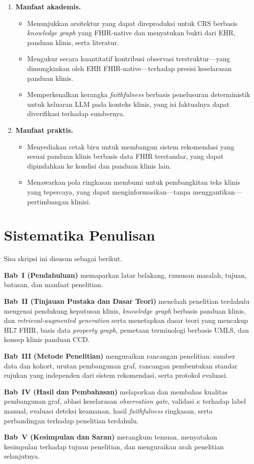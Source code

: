 \begin{enumerate}
    \item \textbf{Manfaat akademis.}
    \begin{itemize}
        \item Menunjukkan arsitektur yang dapat direproduksi untuk CRS berbasis
        \emph{knowledge graph} yang FHIR-native dan menyatukan bukti dari EHR, panduan klinis,
        serta literatur.
        \item Mengukur secara kuantitatif kontribusi observasi terstruktur---yang
        dimungkinkan oleh EHR FHIR-native---terhadap presisi keselarasan panduan klinis.
        \item Memperkenalkan kerangka \emph{faithfulness} berbasis penelusuran deterministik untuk
        keluaran LLM pada konteks klinis, yang isi faktualnya dapat diverifikasi terhadap
        sumbernya.
    \end{itemize}
    \item \textbf{Manfaat praktis.}
    \begin{itemize}
        \item Menyediakan cetak biru untuk membangun sistem rekomendasi yang sesuai panduan klinis
        berbasis data FHIR terstandar, yang dapat dipindahkan ke kondisi dan panduan klinis lain.
        \item Menawarkan pola ringkasan membumi untuk pembangkitan teks klinis yang
        tepercaya, yang dapat menginformasikan---tanpa menggantikan---pertimbangan klinisi.
    \end{itemize}
\end{enumerate}

\section{Sistematika Penulisan}

Sisa skripsi ini disusun sebagai berikut.

\noindent\textbf{Bab~I (Pendahuluan)} memaparkan latar belakang, rumusan masalah, tujuan,
batasan, dan manfaat penelitian.

\noindent\textbf{Bab~II (Tinjauan Pustaka dan Dasar Teori)} menelaah penelitian terdahulu
mengenai pendukung keputusan klinis, \emph{knowledge graph} berbasis panduan klinis, dan
\emph{retrieval-augmented generation} serta menetapkan dasar teori yang mencakup HL7 FHIR,
basis data \emph{property graph}, pemetaan terminologi berbasis UMLS, dan konsep klinis
panduan CCD.

\noindent\textbf{Bab~III (Metode Penelitian)} menguraikan rancangan penelitian: sumber data
dan kohort, urutan pembangunan graf, rancangan pembentukan standar rujukan yang independen dari sistem
rekomendasi, serta protokol evaluasi.

\noindent\textbf{Bab~IV (Hasil dan Pembahasan)} melaporkan dan membahas kualitas
pembangunan graf, ablasi keselarasan \emph{observation gate}, validasi $\kappa$ terhadap
label manual, evaluasi deteksi keamanan, hasil \emph{faithfulness} ringkasan,
serta perbandingan terhadap penelitian terdahulu.

\noindent\textbf{Bab~V (Kesimpulan dan Saran)} merangkum temuan, menyatakan kesimpulan
terhadap tujuan penelitian, dan menguraikan arah penelitian selanjutnya.
